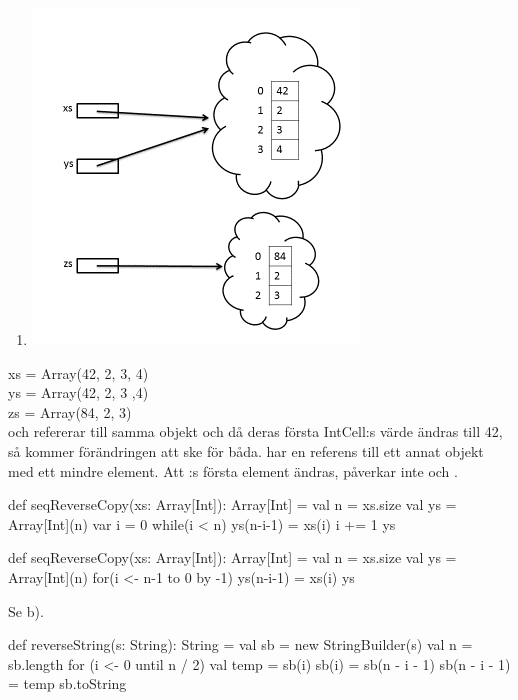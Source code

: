 \begin{enumerate}
\item \includegraphics[scale=1.2]{../img/w05-solutions/memory-pic-6}
\end{enumerate}
xs = Array(42, 2, 3, 4)\\
ys = Array(42, 2, 3 ,4)\\
zs = Array(84, 2, 3)\\
 och  refererar till samma objekt och då deras första IntCell:s värde ändras till 42, så kommer förändringen att ske för båda.
 har en referens till ett annat objekt med ett mindre element. Att :s första element ändras, påverkar inte  och .


\Task %

\Subtask \begin{Code}
def seqReverseCopy(xs: Array[Int]): Array[Int] = {
  val n = xs.size
  val ys = Array[Int](n)
  var i = 0
  while(i < n) {
    ys(n-i-1) = xs(i)
    i += 1
  }
  ys
}
\end{Code}

\Subtask \begin{Code}
def seqReverseCopy(xs: Array[Int]): Array[Int] = {
  val n = xs.size
  val ys = Array[Int](n)
  for(i <- n-1 to 0 by -1) ys(n-i-1) = xs(i)
  ys
}
\end{Code}

\Subtask Se b).


\Task %

\Subtask \begin{Code}
def reverseString(s: String): String = {
  val sb = new StringBuilder(s)
  val n = sb.length
  for (i <- 0 until n / 2) { 
    val temp = sb(i)
    sb(i) = sb(n - i - 1)
    sb(n - i - 1) = temp
  }
  sb.toString     
}
\end{Code}


